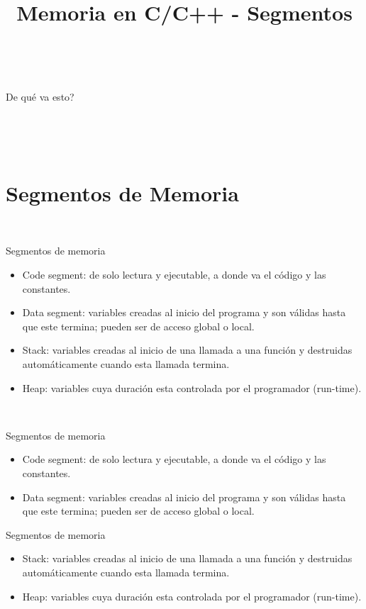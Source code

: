 

\title%
{Memoria en C/C++ - Segmentos}

\subject{Memoria en C/C++ - Segmentos}




\begin{frame}
   \titlepage
\end{frame}

~%
\begin{frame}{De qu\'e va esto?}
   \tableofcontents
\end{frame}
~%

~%
\section{Segmentos de Memoria}
~%
\begin{frame}[fragile,label=SM]{Segmentos de memoria}
   \begin{itemize}
      \item<1-> Code segment: de solo lectura y ejecutable, a donde va el c\'odigo y las constantes.
      \item<2-> Data segment: variables creadas al inicio del programa y son v\'alidas hasta que este termina; pueden ser de acceso global o local.
      \item<3-> Stack: variables creadas al inicio de una llamada a una funci\'on y destruidas autom\'aticamente cuando esta llamada termina.
      \item<4-> Heap: variables cuya duraci\'on esta controlada por el programador (run-time).
   \end{itemize}
\end{frame}
~%
\begin{frame}[fragile]{Segmentos de memoria}
   \begin{itemize}
      \item<1-> Code segment: de solo lectura y ejecutable, a donde va el c\'odigo y las constantes.
      \item<2-> Data segment: variables creadas al inicio del programa y son v\'alidas hasta que este termina; pueden ser de acceso global o local.
   \end{itemize}
\end{frame}
\begin{frame}[fragile]{Segmentos de memoria}
   \begin{itemize}
      \item<3-> Stack: variables creadas al inicio de una llamada a una funci\'on y destruidas autom\'aticamente cuando esta llamada termina.
      \item<4-> Heap: variables cuya duraci\'on esta controlada por el programador (run-time).
   \end{itemize}
\end{frame}
